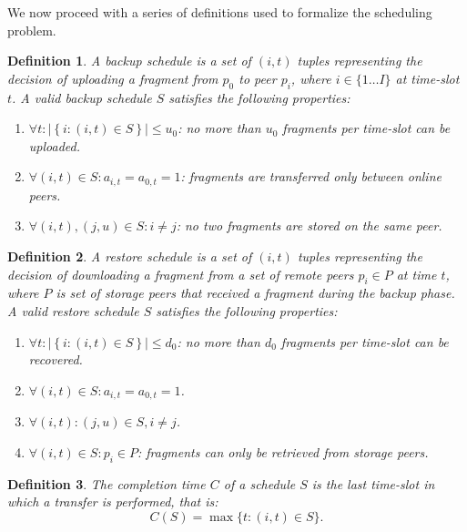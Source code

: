 \documentclass[conference,10pt]{IEEEtran}
\newtheorem{definition}{Definition}
\begin{document}
We now proceed with a series of definitions used to formalize the
scheduling problem.

\begin{definition}
	A \emph{backup schedule} is a set of $(i, t)$ tuples representing the decision of uploading a fragment from $p_0$ to peer $p_i$, where $i \in \{1 \ldots I\}$ at time-slot $t$. A valid backup schedule $S$ satisfies the following properties: 
	\begin{enumerate}
		\item $\forall t: \left|\left\{i : (i, t) \in S\right\}\right| \leq u_0$: no more than $u_0$ fragments per time-slot can be uploaded. 
		\item $\forall (i,t)\in S: a_{i,t}=a_{0,t}=1$: fragments are transferred only between online peers. 
		\item $\forall (i,t), (j, u) \in S: i \neq j$: no two fragments are stored on the same peer. 
	\end{enumerate}
	
	\label{def:backup_schedule} 
\end{definition}

\begin{definition}
	A \emph{restore schedule} is a set of $(i,t)$ tuples representing the decision of downloading a fragment from a set of remote peers $p_i \in P$ at time $t$, where $P$ is set of storage peers that received a fragment during the backup phase. A valid restore schedule $S$ satisfies the following properties: 
	\begin{enumerate}
		\item $\forall t: \left|\left\{i : (i, t) \in S\right\}\right| \leq d_0$: no more than $d_0$ fragments per time-slot can be recovered. 
		\item $\forall (i,t)\in S: a_{i,t}=a_{0,t}=1$. 
		\item $\forall (i,t): (j, u) \in S, i \neq j$. 
		\item $\forall (i,t)\in S: p_i \in P$: fragments can only be retrieved from storage peers. 
	\end{enumerate}
	
	\label{def:restore_schedule} 
\end{definition}

\begin{definition}
	
The \emph{completion time} $C$ of a schedule $S$ is the last time-slot
in which a transfer is performed, that is: $$C(S)= \max \{t:(i,t)\in
S\}.$$
\end{definition}
\end{document}
